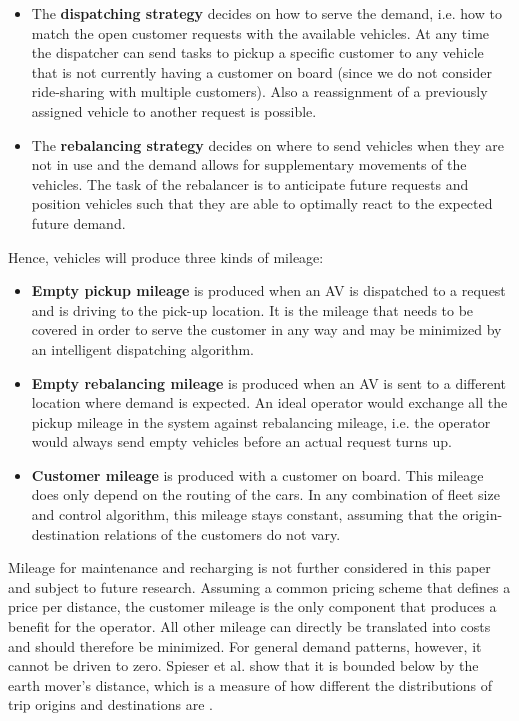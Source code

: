 \begin{itemize}
\item The \textbf{dispatching strategy} decides on how to serve the demand, i.e.
how to match the open customer requests with the available vehicles. At any time the dispatcher can send tasks to pickup a specific customer to any vehicle that is not currently having a customer on board (since we do not consider ride-sharing with multiple customers). Also a reassignment of a previously assigned
vehicle to another request is possible.
\item The \textbf{rebalancing strategy} decides on where to send vehicles when they
are not in use and the demand allows for supplementary movements of the vehicles.
The task of the rebalancer is to anticipate future requests and position vehicles
such that they are able to optimally react to the expected future demand.
\end{itemize}

Hence, vehicles will produce three kinds of mileage:

\begin{itemize}
\item \textbf{Empty pickup mileage} is produced when an AV is dispatched
to a request and is driving to the pick-up location. It is the mileage that needs
to be covered in order to serve the customer in any way and may be minimized
by an intelligent dispatching algorithm.
\item \textbf{Empty rebalancing mileage} is produced when an AV is sent
to a different location where demand is expected. An ideal operator would
exchange all the pickup mileage in the system against rebalancing mileage, i.e. the operator would always send empty vehicles before an actual request turns up.
\item \textbf{Customer mileage} is produced with a customer on board. This mileage does only depend on the routing of the cars. In any combination of fleet size and
control algorithm, this mileage stays constant, assuming that the origin-destination relations of the customers do not vary.
\end{itemize}

Mileage for maintenance and recharging is not further considered in this paper and subject to future research.
Assuming a common pricing scheme that defines a price per distance, the customer mileage
is the only component that produces a benefit for the operator. All other mileage
can directly be translated into costs and should therefore be minimized. For general
demand patterns, however, it cannot be driven to zero. Spieser et al. \cite{spieser2014toward}
show that it is bounded below by the earth mover's distance, which is a measure
of how different the distributions of trip origins and destinations are \cite{ruschendorf1985wasserstein}.

